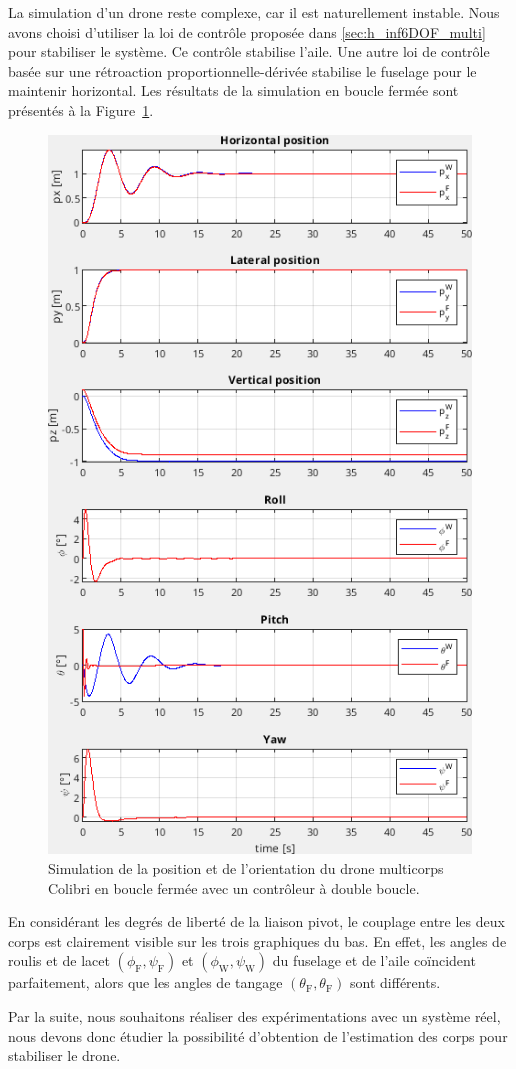 La simulation d'un drone reste complexe, car il est naturellement instable. Nous avons choisi d'utiliser la loi de contrôle proposée dans \ref{sec:h_inf6DOF_multi} pour stabiliser le système. Ce contrôle stabilise l'aile. Une autre loi de contrôle basée sur une rétroaction proportionnelle-dérivée stabilise le fuselage pour le maintenir horizontal. Les résultats de la simulation en boucle fermée sont présentés à la Figure~\ref{fig:sim_colibri}.

\begin{figure}[ht!]
\centering
    \includegraphics[width=0.6\columnwidth,angle=0]{figures/colibri_sim.png}
    \caption{Simulation de la position et de l'orientation du drone multicorps Colibri en boucle fermée avec un contrôleur à double boucle. }
    \label{fig:sim_colibri}
\end{figure}

En considérant les degrés de liberté de la liaison pivot, le couplage entre les deux corps est clairement visible sur les trois graphiques du bas. En effet, les angles de roulis et de lacet $(\phi_{\text{F}}, \psi_{\text{F}})$ et $(\phi_{\text{W}}, \psi_{\text{W}})$ du fuselage et de l'aile coïncident parfaitement, alors que les angles de tangage $(\theta_{\text{F}}, \theta_{\text{F}})$ sont différents.

{\color{blue}
    Par la suite, nous souhaitons réaliser des expérimentations avec un système réel, nous devons donc étudier la possibilité d'obtention de l'estimation des corps pour stabiliser le drone.
}






